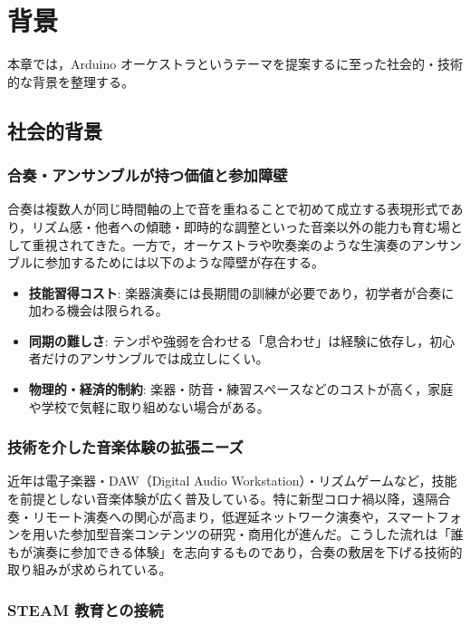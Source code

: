 \chapter{背景}
\label{ch:background}

本章では，Arduino オーケストラというテーマを提案するに至った社会的・技術的な背景を整理する。

\section{社会的背景}
\label{sec:social_background}

\subsection{合奏・アンサンブルが持つ価値と参加障壁}

合奏は複数人が同じ時間軸の上で音を重ねることで初めて成立する表現形式であり，リズム感・他者への傾聴・即時的な調整といった音楽以外の能力も育む場として重視されてきた\cite{mext_music_curriculum}。一方で，オーケストラや吹奏楽のような生演奏のアンサンブルに参加するためには以下のような障壁が存在する。

\begin{itemize}
  \item \textbf{技能習得コスト}: 楽器演奏には長期間の訓練が必要であり，初学者が合奏に加わる機会は限られる。
  \item \textbf{同期の難しさ}: テンポや強弱を合わせる「息合わせ」は経験に依存し，初心者だけのアンサンブルでは成立しにくい。
  \item \textbf{物理的・経済的制約}: 楽器・防音・練習スペースなどのコストが高く，家庭や学校で気軽に取り組めない場合がある。
\end{itemize}

\subsection{技術を介した音楽体験の拡張ニーズ}

近年は電子楽器・DAW（Digital Audio Workstation）・リズムゲームなど，技能を前提としない音楽体験が広く普及している。特に新型コロナ禍以降，遠隔合奏・リモート演奏への関心が高まり，低遅延ネットワーク演奏や，スマートフォンを用いた参加型音楽コンテンツの研究・商用化が進んだ\cite{jacktrip}。こうした流れは「誰もが演奏に参加できる体験」を志向するものであり，合奏の敷居を下げる技術的取り組みが求められている。

\subsection{STEAM 教育との接続}

